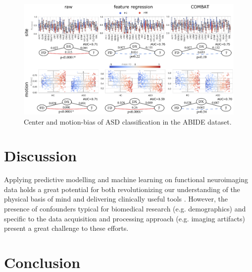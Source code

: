 \documentclass{article}
\begin{document}
\begin{figure}
  \centering
  \includegraphics[width=0.75\paperwidth]{fig/fig_abide.eps}
  \caption{Center and motion-bias of ASD classification in the ABIDE dataset.}
  \label{fig:abide}
\end{figure}

\section{Discussion}

Applying predictive modelling and machine learning on functional neuroimaging data holds a great potential for both revolutionizing our understanding of the physical basis of mind and delivering clinically useful tools \citep{woo2017building, wager2013fmri, spisak2020pain}. However, the presence of confounders typical for biomedical research (e.g. demographics) and specific to the data acquisition and processing approach (e.g. imaging artifacts) present a great challenge to these efforts.

\section{Conclusion}


  


\newpage

\end{document}
